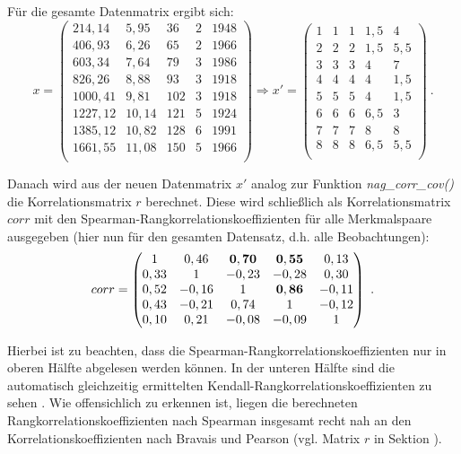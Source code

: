 \noindent Für die gesamte Datenmatrix ergibt sich:
\begin{equation*}
	x =
	\begin{pmatrix}
		214,14 & 5,95 & 36 & 2 & 1948\\
		406,93 & 6,26 & 65 & 2 & 1966\\
		603,34 & 7,64 & 79 & 3 & 1986\\
		826,26 & 8,88 & 93 & 3 & 1918\\
		1000,41 & 9,81 & 102 & 3 & 1918\\
		1227,12 & 10,14 & 121 & 5 & 1924\\
		1385,12 & 10,82 & 128 & 6 & 1991\\
		1661,55 & 11,08 & 150 & 5 & 1966\\
	\end{pmatrix}
	\Rightarrow
	x' =
	\begin{pmatrix}
		1 & 1 & 1 & 1,5 & 4\\
		2 & 2 & 2 & 1,5 & 5,5\\
		3 & 3 & 3 & 4 & 7\\
		4 & 4 & 4 & 4 & 1,5\\
		5 & 5 & 5 & 4 & 1,5\\
		6 & 6 & 6 & 6,5 & 3\\
		7 & 7 & 7 & 8 & 8\\
		8 & 8 & 8 & 6,5 & 5,5\\
	\end{pmatrix} ~.
\end{equation*}

\noindent Danach wird aus der neuen Datenmatrix $x'$ analog zur Funktion {\it nag\_corr\_cov()} die Korrelationsmatrix $r$ berechnet. Diese wird schließlich als Korrelationsmatrix $corr$ mit den Spearman-Rangkorrelationskoeffizienten für alle Merkmalspaare ausgegeben (hier nun für den gesamten Datensatz, d.h. alle Beobachtungen):
\begin{equation*}
	corr =
	\begin{pmatrix}
		1 & 0,46 & {\bf 0,70} & {\bf 0,55} & 0,13\\
		0,33 & 1 & -0,23 & -0,28 & 0,30\\
		0,52 & -0,16 & 1 & {\bf 0,86} & -0,11\\
		0,43 & -0,21 & 0,74 & 1 & -0,12\\
		0,10 & 0,21 & -0,08 & -0,09 & 1\\
	\end{pmatrix} ~.
\end{equation*}

\noindent Hierbei ist zu beachten, dass die Spearman-Rangkorrelationskoeffizienten nur in oberen Hälfte abgelesen werden können. In der unteren Hälfte sind die automatisch gleichzeitig ermittelten Kendall-Rangkorrelationskoeffizienten zu sehen \cite[S. 2-3]{nag:g02brc}. Wie offensichlich zu erkennen ist, liegen die berechneten Rangkorrelationskoeffizienten nach Spearman insgesamt recht nah an den Korrelationskoeffizienten nach Bravais und Pearson (vgl. Matrix $r$ in Sektion ).

